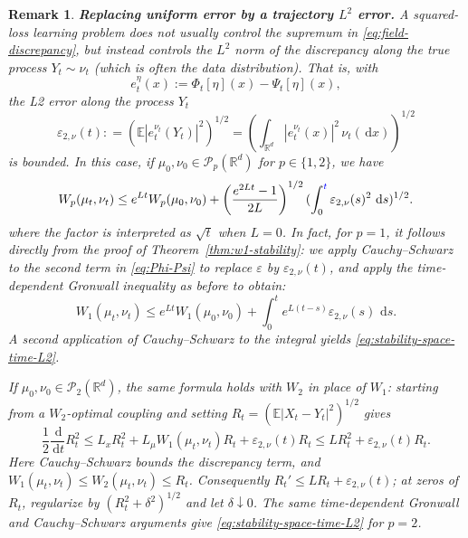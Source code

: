 \documentclass[11pt]{amsart}
\numberwithin{equation}{section}
\theoremstyle{plain}
\newtheorem{remark}[theorem]{Remark}
\newcommand{\R}{\mathbb{R}}
\newcommand{\E}{\mathbb{E}}
\newcommand{\cP}{\mathcal{P}}
\newcommand{\dd}{\,\mathrm{d}}
\newcommand{\abs}[1]{\left\lvert#1\right\rvert}
\newcommand{\blue}[1]{{\color{blue}#1}}
\begin{document}
\begin{remark} \textbf{Replacing uniform error by a trajectory
$L^2$ error.}  
A squared-loss learning problem does not usually control the supremum in
\eqref{eq:field-discrepancy}, but instead controls the $L^2$ norm of the discrepancy along the true process $Y_t\sim\nu_t$ (which is often the data distribution). That is, 
with 
\[ e_t^\eta(x):=\Phi_t[\eta](x)-\Psi_t[\eta](x), \]
the L2 error along the process $Y_t$ 
\begin{equation}\label{eq:trajectory-L2-error}
\varepsilon_{2,\nu}(t): = \left(\E\abs{e_t^{\nu_t}(Y_t)}^2\right)^{1/2}= \left(\int_{\R^d}\abs{e_t^{\nu_t}(x)}^2\,\nu_t(\dd x)\right)^{1/2}
\end{equation}
is bounded. 
In this case, if $\mu_0,\nu_0\in\cP_p(\R^d)$ for $p\in \{1,2\}$, we have 
\begin{equation}\label{eq:stability-space-time-L2}
 W_p(\mu_t,\nu_t)
 \leq e^{Lt}W_p(\mu_0,\nu_0)
 +\left(\frac{e^{2Lt}-1}{2L}\right)^{1/2}
(\int_0^{\blue{t}}\varepsilon_{2,\nu}(s)^2\,\dd s)^{1/2}.
\end{equation}
where the factor is interpreted as $\sqrt t$ when $L=0$. In fact, for $p=1$, it follows directly from the proof of Theorem~\ref{thm:w1-stability}: we apply Cauchy--Schwarz to the second term in  \eqref{eq:Phi-Psi} to replace $\varepsilon$  by $\varepsilon_{2,\nu}(t)$, and apply the time-dependent Gronwall inequality as before to obtain:
\begin{equation}\label{eq:stability-occupation-L2}
 W_1(\mu_t,\nu_t)
 \leq e^{Lt}W_1(\mu_0,\nu_0)
 +\int_0^t e^{L(t-s)}\varepsilon_{2,\nu}(s)\,\dd s.
\end{equation}
A second application of Cauchy--Schwarz to the integral yields \eqref{eq:stability-space-time-L2}. 



If $\mu_0,\nu_0\in\cP_2(\R^d)$, the same formula holds with $W_2$ in place of
$W_1$: starting from a $W_2$-optimal coupling and setting
$R_t=(\E\abs{X_t-Y_t}^2)^{1/2}$ gives
\[
 \frac12\frac{\dd}{\dd t}R_t^2
 \leq L_xR_t^2+L_\mu W_1(\mu_t,\nu_t)R_t
       +\varepsilon_{2,\nu}(t)R_t
 \leq LR_t^2+\varepsilon_{2,\nu}(t)R_t.
\]
Here Cauchy--Schwarz bounds the discrepancy term, and
$W_1(\mu_t,\nu_t)\leq W_2(\mu_t,\nu_t)\leq R_t$.
Consequently $R_t'\leq LR_t+\varepsilon_{2,\nu}(t)$; at zeros of $R_t$,
regularize by $(R_t^2+\delta^2)^{1/2}$ and let $\delta\downarrow0$.
The same time-dependent Gronwall and Cauchy--Schwarz arguments give
\eqref{eq:stability-space-time-L2} for $p=2$.


\end{remark}
\end{document}
